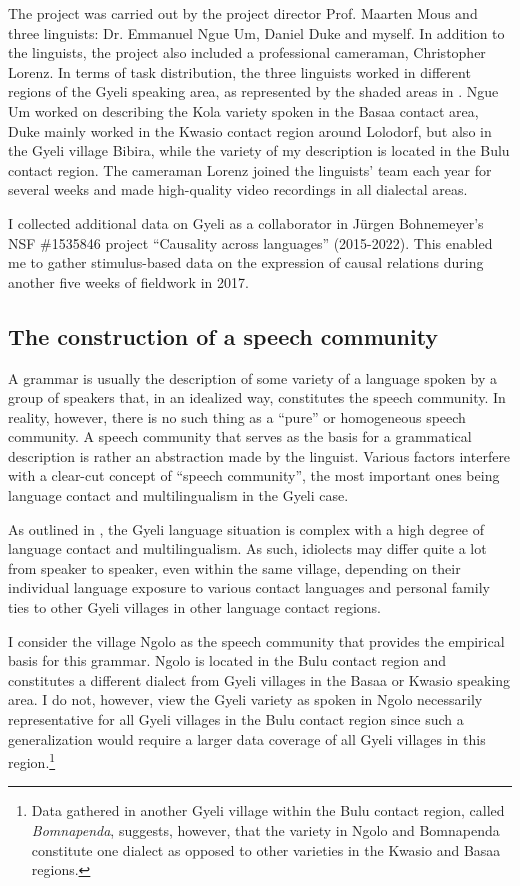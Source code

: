 The project was carried out by the project director Prof. Maarten Mous and three linguists: Dr. Emmanuel Ngue Um, Daniel Duke and myself. In addition to the linguists, the project also included a professional cameraman, Christopher Lorenz. In terms of task distribution, the three linguists 
worked in different regions of the Gyeli speaking area, as represented by the shaded areas in . Ngue Um worked on describing the Kola variety spoken in the Basaa contact area, Duke mainly worked in the Kwasio contact region around Lolodorf, but also in the Gyeli village Bibira, while the variety of my description is located in the Bulu contact region. The cameraman Lorenz joined the linguists' team each year for several weeks and made high-quality video recordings in all dialectal areas.

I collected additional data on Gyeli as a collaborator in J\"urgen Bohnemeyer's NSF \#1535846 project ``Causality across languages'' (2015-2022). This enabled me to gather stimulus-based data on the expression of causal relations during another five weeks of fieldwork in 2017.


\subsection{The construction of a speech community}

A grammar is usually the description of some variety of a language spoken by a group of speakers that, in an idealized way, constitutes the speech community. In reality, however,   
there is no such thing as a ``pure'' or homogeneous speech community. A speech community that serves as the basis for a grammatical description is rather an abstraction made by the linguist. Various factors interfere with a clear-cut concept of ``speech community'', the most important ones being language contact and multilingualism in the Gyeli case.

As outlined in , the Gyeli language situation is complex with a high degree of language contact and multilingualism. As such, idiolects may differ quite a lot from speaker to speaker, even within the same village, depending on their individual language exposure to various contact languages and personal family ties to other Gyeli villages in other language contact regions.

I consider the village Ngolo as the speech community that provides the empirical basis for this grammar. Ngolo is located in the Bulu contact region and constitutes a different dialect from Gyeli villages in the Basaa or Kwasio speaking area. I do not, however, view the Gyeli variety as spoken in Ngolo necessarily representative for all Gyeli villages in the Bulu contact region since such a generalization would require a larger data coverage of all Gyeli villages in this region.\footnote{Data gathered in another Gyeli village within the Bulu contact region, called {\itshape Bomnapenda}, suggests, however, that the variety in Ngolo and Bomnapenda constitute one dialect as opposed to other varieties in the Kwasio and Basaa regions.}

